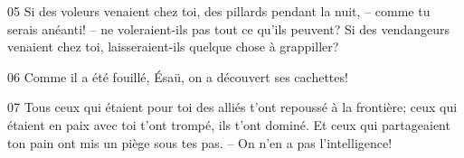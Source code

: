 
05 Si des voleurs venaient chez toi, des pillards pendant la nuit, – comme tu serais anéanti! –  ne voleraient-ils pas tout ce qu’ils peuvent? Si des vendangeurs venaient chez toi, laisseraient-ils quelque chose à grappiller?

06 Comme il a été fouillé, Ésaü, on a découvert ses cachettes!

07 Tous ceux qui étaient pour toi des alliés t’ont repoussé à la frontière; ceux qui étaient en paix avec toi t’ont trompé, ils t’ont dominé. Et ceux qui partageaient ton pain ont mis un piège sous tes pas. – On n’en a pas l’intelligence!
